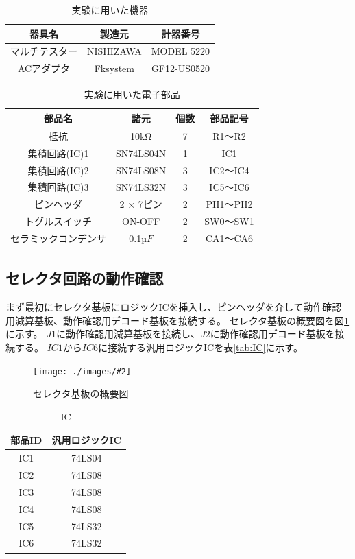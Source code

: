 \documentclass[a4paper,11pt,dvipdfmx]{jsarticle}
\newcommand{\Figure}[4]{
\begin{figure}[H]
\centering
\texttt{[image: ./images/\#2]}
\caption{#3}
\label{fig:#4}
\end{figure}
}
\begin{document}
\begin{table}[H]
  \caption{実験に用いた機器}
  \centering
  \begin{tabular}{c|c|c}
    \hline
    器具名         & 製造元    & 計器番号    \\
    \hline \hline
    マルチテスター & NISHIZAWA & MODEL 5220  \\
    \hline
    ACアダプタ     & Fksystem  & GF12-US0520 \\
    \hline
  \end{tabular}
  \label{tab:equipment}
\end{table}

\begin{table}[H]
  \caption{実験に用いた電子部品}
  \centering
  \begin{tabular}{c|c|c|c}
    \hline
    部品名               & 諸元          & 個数 & 部品記号 \\
    \hline \hline
    抵抗                 & 10kΩ   & 7    & R1～R2   \\
    \hline
    集積回路(IC)1        & SN74LS04N     & 1    & IC1      \\
    \hline
    集積回路(IC)2        & SN74LS08N     & 3    & IC2～IC4 \\
    \hline
    集積回路(IC)3        & SN74LS32N     & 3    & IC5～IC6 \\
    \hline
    ピンヘッダ           & 2 × 7ピン & 2    & PH1～PH2 \\
    \hline
    トグルスイッチ       & ON-OFF        & 2    & SW0～SW1 \\
    \hline
    セラミックコンデンサ & 0.1µ$F$       & 2    & CA1～CA6 \\
    \hline
  \end{tabular}
  \label{tab:electronicParts}
\end{table}



\subsection{セレクタ回路の動作確認}
まず最初にセレクタ基板にロジックICを挿入し、ピンヘッダを介して動作確認用減算基板、動作確認用デコード基板を接続する。
セレクタ基板の概要図を図\ref{fig:selector}に示す。
$J1$に動作確認用減算基板を接続し、$J2$に動作確認用デコード基板を接続する。
$IC1$から$IC6$に接続する汎用ロジックICを表\ref{tab:IC}に示す。
\Figure{0.8}{kiban.drawio.png}{セレクタ基板の概要図}{selector}
\begin{table}[H]
  \centering
  \caption{IC}
  \begin{tabular}{|c|c|}
    \hline
    部品ID  &  汎用ロジックIC  \\
    \hline
    IC1  &  74LS04  \\
    IC2  &  74LS08  \\
    IC3  &  74LS08  \\
    IC4  &  74LS08  \\
    IC5  &  74LS32  \\
    IC6  &  74LS32  \\
    \hline
  \end{tabular}
\end{table}
\end{document}
